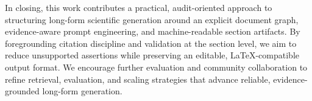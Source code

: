 In closing, this work contributes a practical, audit-oriented approach to structuring long-form scientific generation around an explicit document graph, evidence-aware prompt engineering, and machine-readable section artifacts. By foregrounding citation discipline and validation at the section level, we aim to reduce unsupported assertions while preserving an editable, LaTeX-compatible output format. We encourage further evaluation and community collaboration to refine retrieval, evaluation, and scaling strategies that advance reliable, evidence-grounded long-form generation.